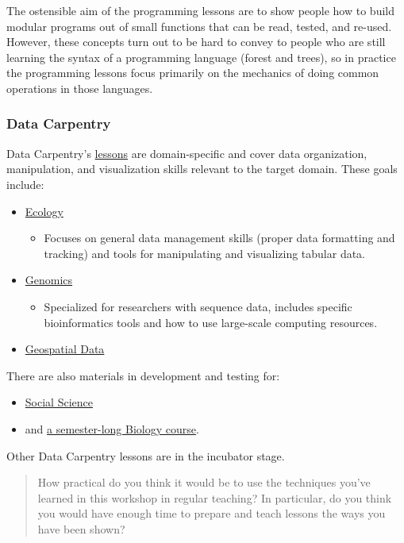 The ostensible aim of the programming lessons are to show people how to
build modular programs out of small functions that can be read, tested,
and re-used. However, these concepts turn out to be hard to convey to
people who are still learning the syntax of a programming language
(forest and trees), so in practice the programming lessons focus
primarily on the mechanics of doing common operations in those
languages.

\subsubsection{Data Carpentry}\label{data-carpentry}

Data Carpentry's \href{\{\{\%20site.dc\_site\%20\}\}/lessons/}{lessons}
are domain-specific and cover data organization, manipulation, and
visualization skills relevant to the target domain. These goals include:

\begin{itemize}
\itemsep1pt\parskip0pt
\item
  \href{\{\{\%20site.dc\_site\%20\}\}/lessons/\#ecology-workshop}{Ecology}

  \begin{itemize}
  \itemsep1pt\parskip0pt
  \item
    Focuses on general data management skills (proper data formatting
    and tracking) and tools for manipulating and visualizing tabular
    data.
  \end{itemize}
\item
  \href{\{\{\%20site.dc\_site\%20\}\}/lessons/\#genomics-workshop}{Genomics}

  \begin{itemize}
  \itemsep1pt\parskip0pt
  \item
    Specialized for researchers with sequence data, includes specific
    bioinformatics tools and how to use large-scale computing
    resources.
  \end{itemize}
\item
  \href{\{\{\%20site.dc\_site\%20\}\}/lessons/\#geospatial-data-workshop}{Geospatial
  Data}
\end{itemize}

There are also materials in development and testing for:

\begin{itemize}
\itemsep1pt\parskip0pt
\item
  \href{\{\{\%20site.dc\_site\%20\}\}/lessons/\#social-science-materials}{Social
  Science}
\item
  and \href{\{\{\%20site.dc\_site\%20\}\}/semester-biology/}{a
  semester-long Biology course}.
\end{itemize}

Other Data Carpentry lessons are in the incubator stage.

\begin{quote}
How practical do you think it would be to use the techniques you've
learned in this workshop in regular teaching? In particular, do you
think you would have enough time to prepare and teach lessons the ways
you have been shown?
\end{quote}
